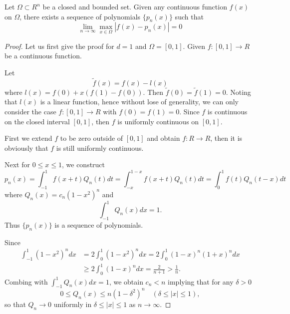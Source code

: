 \begin{theorem}
Let $\Omega\subset R^n$ be a  closed and bounded set. Given any continuous function $f(x)$ on $\Omega$, there exists a sequence of polynomials $\{p_n(x)\}$ such 
that 
\begin{equation}
\displaystyle \lim_{n\rightarrow \infty} \max_{x\in \Omega}|f(x)-p_n(x)|=0
\end{equation}
\end{theorem}
\begin{proof}
Let us first give the proof for $d=1$ and $\Omega=[0,1]$. Given $f:[0,1]\rightarrow R$ be a  continuous function. 

Let
\begin{equation}
\tilde f(x)=f(x)-l(x)
\end{equation}
where $l(x)=f(0)+x(f(1)-f(0))$.
Then $\tilde f(0)=\tilde f(1)=0$. Noting that $l(x)$ is a linear function, hence without lose of generality, we can only consider the 
case $f:[0,1]\rightarrow R$ with $f(0)=f(1)=0$. 
Since $f$ is continuous on the closed interval $[0,1]$, then $f$ is uniformly continuous on $[0,1]$.

First we extend $f$ to be zero outside of $[0,1]$ and obtain $f: R\rightarrow R$, then it is obviously that $f$ is still uniformly continuous. 

Next for $0\le x\le 1$, we construct
\begin{equation}
p_n(x)=\int_{-1}^1f(x+t)Q_n(t)dt=\int_{-x}^{1-x}f(x+t)Q_n(t)dt=\int_{0}^{1}f(t)Q_n(t-x)dt
\end{equation} 
where $Q_n(x)=c_n(1-x^2)^n$ and 
\begin{equation}\label{intq}
\int_{-1}^1 Q_n(x) dx=1.
\end{equation} 
Thus $\{p_n(x)\}$ is a sequence of polynomials. 

Since 
\begin{align}
\int_{-1}^1 (1-x^2)^n dx&=2\int_{0}^1 (1-x^2)^n dx=  2\int_{0}^1 (1-x)^n(1+x)^n dx\\ 
&\ge 2\int_{0}^1 (1-x)^n dx=\frac{2}{n+1}> \frac{1}{n}.
\end{align}
Combing with $\int_{-1}^1 Q_n(x) dx=1$, we obtain $c_n< n$ implying that for any $\delta>0$
 \begin{equation}\label{qest}
 0\le Q_n(x)\le n(1-\delta^2)^n \quad (\delta\le |x|\le 1),
 \end{equation}
so that $Q_n\rightarrow 0$ uniformly in $\delta\le |x|\le 1$ as $n\rightarrow \infty$. 


\end{proof}
